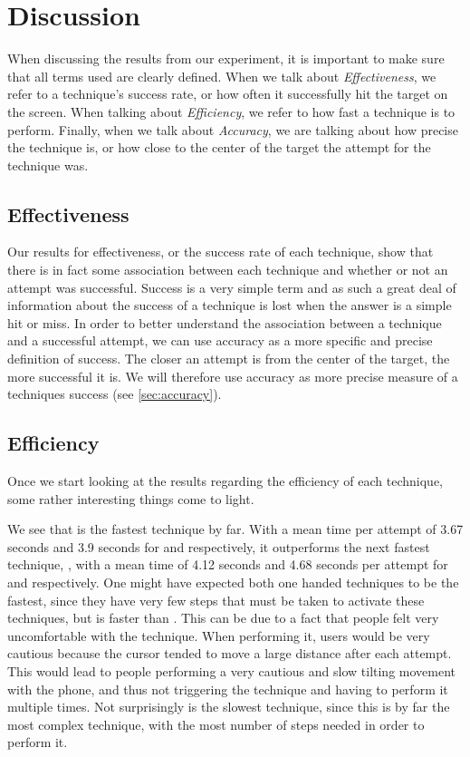 \section{Discussion}\label{sec:discussion}
When discussing the results from our experiment, it is important to make sure that all terms used are clearly defined. When we talk about \emph{Effectiveness}, we refer to a technique's success rate, or how often it successfully hit the target on the screen. When talking about \emph{Efficiency}, we refer to how fast a technique is to perform. Finally, when we talk about \emph{Accuracy}, we are talking about how precise the technique is, or how close to the center of the target the attempt for the technique was. 

\subsection{Effectiveness}

Our results for effectiveness, or the success rate of each technique, show that there is in fact some association between each technique and whether or not an attempt was successful.
Success is a very simple term and as such a great deal of information about the success of a technique is lost when the answer is a simple hit or miss. 
In order to better understand the association between a technique and a successful attempt, we can use accuracy as a more specific and precise definition of success.
The closer an attempt is from the center of the target, the more successful it is.
We will therefore use accuracy as more precise measure of a techniques success (see \cref{sec:accuracy}).


\subsection{Efficiency}

Once we start looking at the results regarding the efficiency of each technique, some rather interesting things come to light.

We see that \swipe is the fastest technique by far.
With a mean time per attempt of 3.67 seconds and 3.9 seconds for \pull and \push respectively, it outperforms the next fastest technique, \throw, with a mean time of 4.12 seconds and 4.68 seconds per attempt for \pull and \push respectively. 
One might have expected both one handed techniques to be the fastest, since they have very few steps that must be taken to activate these techniques, but \throw is faster than \tilt. 
This can be due to a fact that people felt very uncomfortable with the \tilt technique.
When performing it, users would be very cautious because the cursor tended to move a large distance after each attempt.
This would lead to people performing a very cautious and slow tilting movement with the phone, and thus not triggering the technique and having to perform it multiple times. 
Not surprisingly \grab is the slowest technique, since this is by far the most complex technique, with the most number of steps needed in order to perform it.

